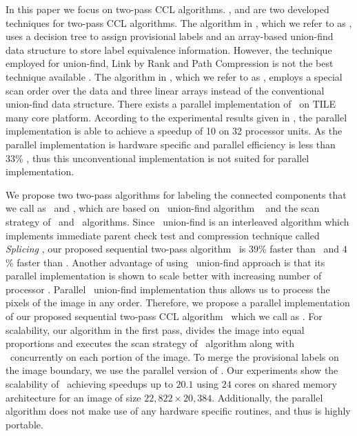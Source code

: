 In this paper we focus on two-pass CCL algorithms. \cite{Wu2009_LRPC}, and \cite{He2012_ARun} are two
developed techniques for two-pass CCL algorithms.
The algorithm in \cite{Wu2009_LRPC}, which we refer to as \lrpc, uses a decision tree to assign provisional labels and an 
array-based union-find data structure
to store label equivalence information. However, the technique employed for
union-find, Link by Rank and Path Compression is not the best technique available \cite{Patwary2012_PARemSP}. 
The algorithm in \cite{He2012_ARun}, which we refer to as \arun, employs a special scan order over the data and three linear
arrays instead of the conventional union-find data structure. There
exists a parallel implementation of \arun\ on TILE many core
platform\cite{Chen2013_PARun}. According to the
experimental results given in \cite{Chen2013_PARun}, the parallel implementation is able to achieve a speedup of 10 on
32 processor units. 
As the parallel implementation is hardware specific and
parallel efficiency is less than 33\% , thus this unconventional
implementation is not suited for parallel implementation.


We propose two two-pass algorithms for labeling the connected components that we
call as \aremsp\ and \nremsp, which are based on \rems\ union-find algorithm
\remsp\ \cite{Patwary2010_RemSP, Dijkstra1976_RemSP} and the scan strategy of \arun\ and
\lrpc\ algorithms.
Since \rems\ union-find is an interleaved algorithm which implements immediate parent check test and 
compression technique called {\em Splicing} \cite{Patwary2010_RemSP,
Dijkstra1976_RemSP}, our proposed sequential two-pass algorithm \aremsp\ is $39$\% faster than \lrpc\
and $4$\% faster than \arun.
Another advantage of using \rems\ union-find approach is that its parallel implementation is shown to scale better
with increasing number of processor \cite{Patwary2012_PARemSP}. Parallel \rems\ union-find implementation thus allows us to
process the pixels of the image in any order. Therefore, we propose a parallel implementation of our proposed
sequential two-pass CCL algorithm \aremsp\ which we call as \paremsp. For
scalability, our algorithm in the first pass, divides the image into equal proportions and executes the scan strategy of \arun\ algorithm along with \remsp\
concurrently on each portion of the image. To merge the provisional labels on the image boundary, we use the parallel version
of \remsp \cite{Patwary2012_PARemSP}. Our experiments show
the scalability of \paremsp\ achieving speedups up to $20.1$ using $24$ cores
on shared memory architecture for an image of size $22,822 \times 20,384$.
Additionally, the parallel algorithm does not make use of any hardware specific routines, and thus is highly portable.

